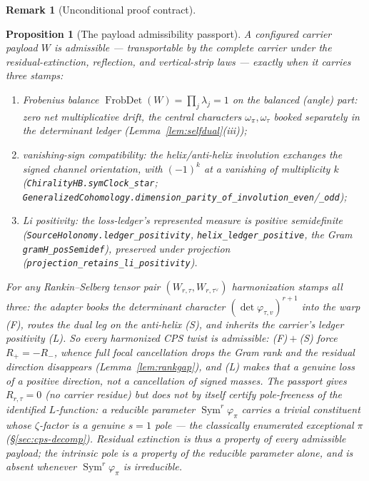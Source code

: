 \documentclass[11pt]{article}
\newtheorem{proposition}[theorem]{Proposition}
\theoremstyle{definition}
\newtheorem{remark}[theorem]{Remark}
\newcommand{\Sym}{\operatorname{Sym}}
\begin{document}
\begin{remark}[Unconditional proof contract]
\begin{enumerate}
\begin{proposition}[The payload admissibility passport]\label{prop:passport}
A configured carrier payload $W$ is \emph{admissible} --- transportable by the complete carrier
under the residual-extinction, reflection, and vertical-strip laws --- exactly when it carries three stamps:
\begin{enumerate}
\item[\textup{(F)}] \emph{Frobenius balance} $\operatorname{FrobDet}(W)=\prod_j\lambda_j=1$ on the balanced
(angle) part: zero net multiplicative drift, the central characters $\omega_\pi,\omega_\tau$ booked separately in
the determinant ledger (Lemma~\ref{lem:selfdual}(iii));
\item[\textup{(S)}] \emph{vanishing-sign compatibility}: the helix/anti-helix involution exchanges the signed
channel orientation, with $(-1)^k$ at a vanishing of multiplicity $k$ (\texttt{ChiralityHB.symClock\_star};
\texttt{GeneralizedCohomology.dimension\_parity\_of\_involution\_even}/\texttt{\_odd});
\item[\textup{(L)}] \emph{Li positivity}: the loss-ledger's represented measure is positive semidefinite
(\texttt{SourceHolonomy.ledger\_positivity}, \texttt{helix\_ledger\_positive}, the Gram
\texttt{gramH\_posSemidef}), preserved under projection (\texttt{projection\_retains\_li\_positivity}).
\end{enumerate}
For any Rankin--Selberg tensor pair $(W_{r,\tau},W_{r,\tau^\vee})$ harmonization stamps all three: the adapter
books the determinant character $(\det\varphi_{\tau,v})^{r+1}$ into the warp \textup{(F)}, routes the dual leg
on the anti-helix \textup{(S)}, and inherits the carrier's ledger positivity \textup{(L)}. So \emph{every}
harmonized CPS twist is admissible: \textup{(F)}${}+{}$\textup{(S)} force $R_+=-R_-$, whence full focal
cancellation drops the Gram rank and the residual direction disappears (Lemma~\ref{lem:rankgap}), and
\textup{(L)} makes that a genuine loss of a positive direction, not a cancellation of signed masses. The
passport gives $R_{r,\tau}=0$ (no carrier residue) but does \emph{not} by itself certify pole-freeness of the
identified $L$-function: a reducible parameter $\Sym^r\varphi_\pi$ carries a trivial constituent whose
$\zeta$-factor is a genuine $s=1$ pole --- the classically enumerated exceptional $\pi$ (\S\ref{sec:cps-decomp}).
Residual extinction is thus a property of \emph{every} admissible payload; the intrinsic pole is a property of
the reducible parameter alone, and is absent whenever $\Sym^r\varphi_\pi$ is irreducible.
\end{proposition}


\end{enumerate}
\end{remark}
\end{document}

